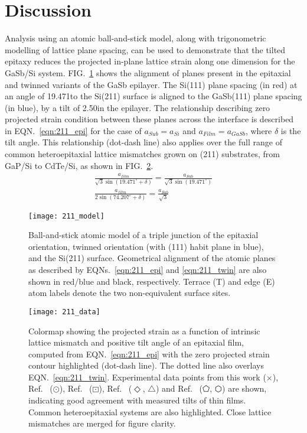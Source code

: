 \section{Discussion}
Analysis using an atomic ball-and-stick model, along with trigonometric modelling of lattice plane spacing, can be used to demonstrate that the tilted epitaxy reduces the projected in-plane lattice strain along one dimension for the GaSb/Si system. FIG.~\ref{fig:211_model} shows the alignment of planes present in the epitaxial and twinned variants of the GaSb epilayer. The Si(111) plane spacing (in red) at an angle of 19.471\degree to the Si(211) surface is aligned to the GaSb(111) plane spacing (in blue), by a tilt of 2.50\degree in the epilayer. The relationship describing zero projected strain condition between these planes across the interface is described in EQN.~\ref{eqn:211_epi} for the case of $a_{Sub} = a_{Si}$ and $a_{Film} = a_{GaSb}$, where $\delta$ is the tilt angle. This relationship (dot-dash line) also applies over the full range of common heteroepitaxial lattice mismatches grown on (211) substrates, from GaP/Si to CdTe/Si, as shown in FIG.~\ref{fig:211_data}.
\begin{gather} 
 \frac{ a_{film}}{\sqrt{3} \sin(19.471^\circ + \delta)} = \frac{a_{Sub}}{\sqrt{3}\sin(19.471^\circ)} \label{eqn:211_epi}\\
 \frac{ a_{film}}{2\sin(74.207^\circ + \delta)} = \frac{ a_{Sub}}{\sqrt{3}}   \label{eqn:211_twin}
\end{gather}
\begin{figure}
    \centering
\texttt{[image: 211\_model]}
\caption{\label{fig:211_model}Ball-and-stick atomic model of a triple junction of the epitaxial orientation, twinned orientation (with (111) habit plane in blue), and the Si(211) surface. Geometrical alignment of the atomic planes as described by EQNs.~\ref{eqn:211_epi} and \ref{eqn:211_twin} are also shown in red/blue and black, respectively. Terrace (T) and edge (E) atom labels denote the two non-equivalent surface sites.}	
\end{figure}
\begin{figure}
    \centering
\texttt{[image: 211\_data]}
\caption{\label{fig:211_data}Colormap showing the projected strain as a function of 
intrinsic lattice mismatch and positive tilt angle of an epitaxial film, computed from 
EQN.~\ref{eqn:211_epi} with the zero projected strain contour highlighted (dot-dash 
line). The dotted line also overlays EQN.~\ref{eqn:211_twin}. Experimental data points 
from this work ($\times$), Ref.~\textcite{Zhao2011} ($\odot$), Ref.~\textcite{Wang2011a} 
($\boxdot$), Ref.~\textcite{Johnson2011} ($\Diamond$, $\bigtriangleup$) and 
Ref.~\textcite{smith2012_znte,smith2012_gaas} ($\pentagon$, $\varhexagon$) are shown, 
indicating good agreement with measured tilts of thin films. Common heteroepitaxial 
systems are also highlighted. Close lattice mismatches are merged for figure clarity.}
\end{figure}
